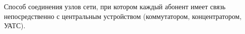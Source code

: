 Способ соединения узлов сети, при котором каждый абонент имеет 
связь непосредственно с центральным устройством
(коммутатором, концентратором, УАТС).